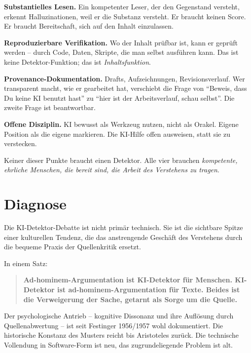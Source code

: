\textbf{Substantielles Lesen.} Ein kompetenter Leser, der den
Gegenstand versteht, erkennt Halluzinationen, weil er die Substanz
versteht. Er braucht keinen Score. Er braucht Bereitschaft, sich
auf den Inhalt einzulassen.

\textbf{Reproduzierbare Verifikation.} Wo der Inhalt prüfbar ist,
kann er geprüft werden -- durch Code, Daten, Skripte, die man
selbst ausführen kann. Das ist keine Detektor-Funktion; das ist
\emph{Inhaltsfunktion}.

\textbf{Provenance-Dokumentation.} Drafts, Aufzeichnungen,
Revisionsverlauf. Wer transparent macht, wie er gearbeitet hat,
verschiebt die Frage von \enquote{Beweis, dass Du keine KI benutzt
hast} zu \enquote{hier ist der Arbeitsverlauf, schau selbst}. Die
zweite Frage ist beantwortbar.

\textbf{Offene Disziplin.} KI bewusst als Werkzeug nutzen, nicht
als Orakel. Eigene Position als die eigene markieren. Die KI-Hilfe
offen ausweisen, statt sie zu verstecken.

Keiner dieser Punkte braucht einen Detektor. Alle vier brauchen
\emph{kompetente, ehrliche Menschen, die bereit sind, die Arbeit
des Verstehens zu tragen}.

\section{Diagnose}

Die KI-Detektor-Debatte ist nicht primär technisch. Sie ist die
sichtbare Spitze einer kulturellen Tendenz, die das anstrengende
Geschäft des Verstehens durch die bequeme Praxis der Quellenkritik
ersetzt.

In einem Satz:

\begin{quote}
\textbf{Ad-hominem-Argumentation ist KI-Detektor für Menschen. KI-
Detektor ist ad-hominem-Argumentation für Texte. Beides ist die
Verweigerung der Sache, getarnt als Sorge um die Quelle.}
\end{quote}

Der psychologische Antrieb -- kognitive Dissonanz und ihre Auflösung
durch Quellenabwertung -- ist seit Festinger 1956/1957 wohl
dokumentiert. Die historische Konstanz des Musters reicht bis
Aristoteles zurück. Die technische Vollendung in Software-Form ist
neu, das zugrundeliegende Problem ist alt.

